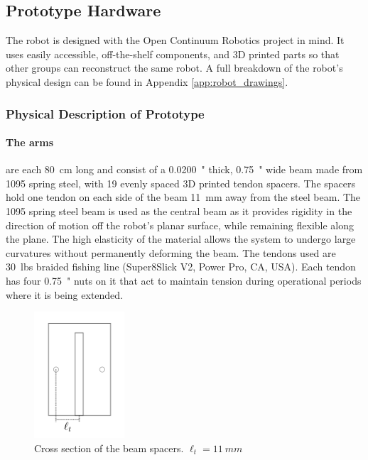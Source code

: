 \subsection{Prototype Hardware}
The robot is designed with the Open Continuum Robotics project in mind. It uses easily accessible, off-the-shelf components, and 3D printed parts so that other groups can reconstruct the same robot. A full breakdown of the robot's physical design can be found in Appendix \ref{app:robot_drawings}. 

\subsubsection{Physical Description of Prototype}
\label{sec:physical_description}
\paragraph{The arms} are each \SI{80}{cm} long and consist of a \SI{0.0200}{"} thick, \SI{0.75}{"} wide beam made from 1095 spring steel, with 19 evenly spaced 3D printed tendon spacers. The spacers hold one tendon on each side of the beam \SI{11}{mm} away from the steel beam. The 1095 spring steel beam is used as the central beam as it provides rigidity in the direction of motion off the robot's planar surface, while remaining flexible along the plane. The high elasticity of the material allows the system to undergo large curvatures without permanently deforming the beam. The tendons used are \SI{30}{lbs} braided fishing line (Super8Slick V2, Power Pro, CA, USA). Each tendon has four \SI{0.75}{"} nuts on it that act to maintain tension during operational periods where it is being extended. 

\begin{figure}[h]
    \centering
    \includegraphics[width=0.3\textwidth]{images/beam_cross_section.png}
    \caption{Cross section of the beam spacers. $\ell_t = \SI{11}{mm}$}
    \label{fig:beam_cross_section}
\end{figure}

